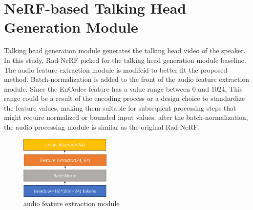 \section{NeRF-based Talking Head Generation Module}
Talking head generation module generates the talking head video of the speaker.
In this study, Rad-NeRF\cite{tang2022radnerf} picked for the talking head generation module baseline.
The audio feature extraction module is modifeid to better fit the proposed method.
Batch-normalization is added to the front of the audio feature extraction module.
Since the EnCodec feature has a value range between 0 and 1024,
This range could be a result of the encoding process or a design choice to standardize the feature values,
making them suitable for subsequent processing steps that might require normalized or bounded input values.
after the batch-normalization, the audio processing module is similar as the original Rad-NeRF.
\begin{figure}
    \centering
    \includegraphics[width=0.4\textwidth]{figures/figure_chap_3/afp.png}
    \caption{audio feature extraction module}
    \label{fig:afp}
\end{figure}

